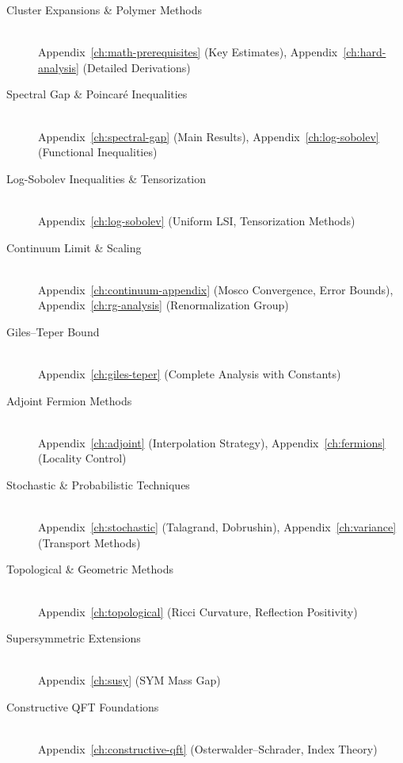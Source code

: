 \documentclass[11pt,a4paper]{report}
\begin{document}
\begin{description}
\item[Cluster Expansions \& Polymer Methods] \hfill \\
  Appendix~\ref{ch:math-prerequisites} (Key Estimates), 
  Appendix~\ref{ch:hard-analysis} (Detailed Derivations)

\item[Spectral Gap \& Poincar\'e Inequalities] \hfill \\
  Appendix~\ref{ch:spectral-gap} (Main Results),
  Appendix~\ref{ch:log-sobolev} (Functional Inequalities)

\item[Log-Sobolev Inequalities \& Tensorization] \hfill \\
  Appendix~\ref{ch:log-sobolev} (Uniform LSI, Tensorization Methods)

\item[Continuum Limit \& Scaling] \hfill \\
  Appendix~\ref{ch:continuum-appendix} (Mosco Convergence, Error Bounds),
  Appendix~\ref{ch:rg-analysis} (Renormalization Group)

\item[Giles--Teper Bound] \hfill \\
  Appendix~\ref{ch:giles-teper} (Complete Analysis with Constants)

\item[Adjoint Fermion Methods] \hfill \\
  Appendix~\ref{ch:adjoint} (Interpolation Strategy),
  Appendix~\ref{ch:fermions} (Locality Control)

\item[Stochastic \& Probabilistic Techniques] \hfill \\
  Appendix~\ref{ch:stochastic} (Talagrand, Dobrushin),
  Appendix~\ref{ch:variance} (Transport Methods)

\item[Topological \& Geometric Methods] \hfill \\
  Appendix~\ref{ch:topological} (Ricci Curvature, Reflection Positivity)

\item[Supersymmetric Extensions] \hfill \\
  Appendix~\ref{ch:susy} (SYM Mass Gap)

\item[Constructive QFT Foundations] \hfill \\
  Appendix~\ref{ch:constructive-qft} (Osterwalder--Schrader, Index Theory)


\end{description}
\end{document}

